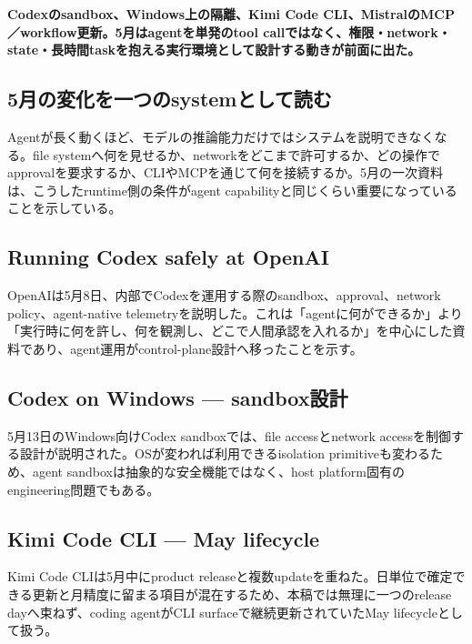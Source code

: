 \noindent\textbf{Codexのsandbox、Windows上の隔離、Kimi Code CLI、MistralのMCP／workflow更新。5月はagentを単発のtool callではなく、権限・network・state・長時間taskを抱える実行環境として設計する動きが前面に出た。}\autocite{src-4a3442a5ca8c,src-66be12207714,src-9191d43918fc,src-ac04c00cf21f,src-d8b7c1c36830}

\subsection{5月の変化を一つのsystemとして読む}

Agentが長く動くほど、モデルの推論能力だけではシステムを説明できなくなる。file systemへ何を見せるか、networkをどこまで許可するか、どの操作でapprovalを要求するか、CLIやMCPを通じて何を接続するか。5月の一次資料は、こうしたruntime側の条件がagent capabilityと同じくらい重要になっていることを示している。\autocite{src-4a3442a5ca8c,src-66be12207714,src-9191d43918fc,src-ac04c00cf21f,src-d8b7c1c36830}


\subsection{Running Codex safely at OpenAI}

OpenAIは5月8日、内部でCodexを運用する際のsandbox、approval、network policy、agent-native telemetryを説明した。これは「agentに何ができるか」より「実行時に何を許し、何を観測し、どこで人間承認を入れるか」を中心にした資料であり、agent運用がcontrol-plane設計へ移ったことを示す。\autocite{src-66be12207714}


\subsection{Codex on Windows — sandbox設計}

5月13日のWindows向けCodex sandboxでは、file accessとnetwork accessを制御する設計が説明された。OSが変われば利用できるisolation primitiveも変わるため、agent sandboxは抽象的な安全機能ではなく、host platform固有のengineering問題でもある。\autocite{src-4a3442a5ca8c}


\subsection{Kimi Code CLI — May lifecycle}

Kimi Code CLIは5月中にproduct releaseと複数updateを重ねた。日単位で確定できる更新と月精度に留まる項目が混在するため、本稿では無理に一つのrelease dayへ束ねず、coding agentがCLI surfaceで継続更新されていたMay lifecycleとして扱う。\autocite{src-9191d43918fc}


